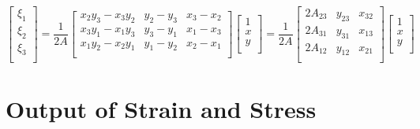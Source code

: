 \begin{equation}
\begin{bmatrix}
\xi_1 \\
\xi_2 \\
\xi_3 \\
\end{bmatrix}
= 
\frac{1}{2A}\begin{bmatrix}
x_2y_3-x_3y_2&y_2-y_3&x_3-x_2 \\
x_3y_1-x_1y_3&y_3-y_1&x_1-x_3 \\
x_1y_2-x_2y_1&y_1-y_2&x_2-x_1 \\
\end{bmatrix}
\begin{bmatrix}
1\\
x \\
y \\
\end{bmatrix}
= 
\frac{1}{2A}\begin{bmatrix}
2A_{23}&y_{23}&x_{32} \\
2A_{31}&y_{31}&x_{13} \\
2A_{12}&y_{12}&x_{21} \\
\end{bmatrix}
\begin{bmatrix}
1 \\
x \\
y \\

\end{bmatrix}
\end{equation}

\section{Output of Strain and Stress}
\cite[p. 18]{bibid}





